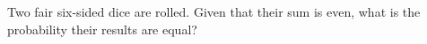 Two fair six-sided dice are rolled. Given that their sum is even, what is the probability their results are equal?
